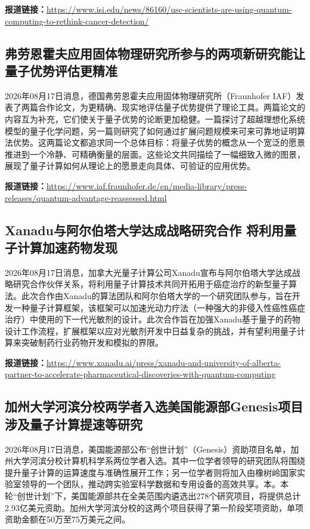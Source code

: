 \documentclass[12pt,a4paper]{ctexart}
\begin{document}
\noindent\textbf{报道链接：}\url{https://www.isi.edu/news/86160/usc-scientists-are-using-quantum-computing-to-rethink-cancer-detection/}

\subsection{ 弗劳恩霍夫应用固体物理研究所参与的两项新研究能让量子优势评估更精准 }

2026年08月17日消息，德国弗劳恩霍夫应用固体物理研究所（Fraunhofer IAF）发表了两篇合作论文，为更精确、现实地评估量子优势提供了理论工具。两篇论文的内容互为补充，它们使关于量子优势的论断更加稳健。一篇探讨了超越理想化系统模型的量子化学问题，另一篇则研究了如何通过扩展问题规模来可来可靠地证明算法优势。这两篇论文都追求同一个总体目标：将量子优势的概念从一个宽泛的愿景推进到一个冷静、可精确衡量的层面。这些论文共同描绘了一幅细致入微的图景，展现了量子计算如何从理论上的愿景走向具体、可验证的应用优势。

\noindent\textbf{报道链接：}\url{https://www.iaf.fraunhofer.de/en/media-library/press-releases/quantum-advantage-reassessed.html}

\subsection{ Xanadu与阿尔伯塔大学达成战略研究合作 将利用量子计算加速药物发现 }

2026年08月17日消息，加拿大光量子计算公司Xanadu宣布与阿尔伯塔大学达成战略研究合作伙伴关系，将利用量子计算技术共同开拓用于癌症治疗的新型量子算法。此次合作由Xanadu的算法团队和阿尔伯塔大学的一个研究团队参与，旨在开发一种量子计算框架，该框架可以加速光动力疗法（一种强大的非侵入性癌性癌症治疗）中使用的下一代光敏剂的设计。此次合作旨在加强Xanadu基于量子的药物设计工作流程，扩展框架以应对光敏剂开发中日益复杂的挑战，并有望利用量子计算来突破制药行业药物开发和模拟的界限。

\noindent\textbf{报道链接：}\url{https://www.xanadu.ai/press/xanadu-and-university-of-alberta-partner-to-accelerate-pharmaceutical-discoveries-with-quantum-computing}

\subsection{ 加州大学河滨分校两学者入选美国能源部Genesis项目 涉及量子计算提速等研究 }

2026年08月17日消息，美国能源部公布“创世计划”（Genesis）资助项目名单，加州大学河滨分校计算机科学系两位学者入选。其中一位学者领导的研究团队将围绕提升量子计算的运算速度与准确性展开工作；另一位学者则将加入由橡树岭国家实验室领导的一个团队，推动跨实验室科学数据和专用设备的高效共享。本。本轮“创世计划”下，美国能源部共在全美范围内遴选出278个研究项目，将提供总计2.93亿美元资助。加州大学河滨分校的这两个项目获得了第一阶段奖项资助，单项资助金额在50万至75万美元之间。
\end{document}
